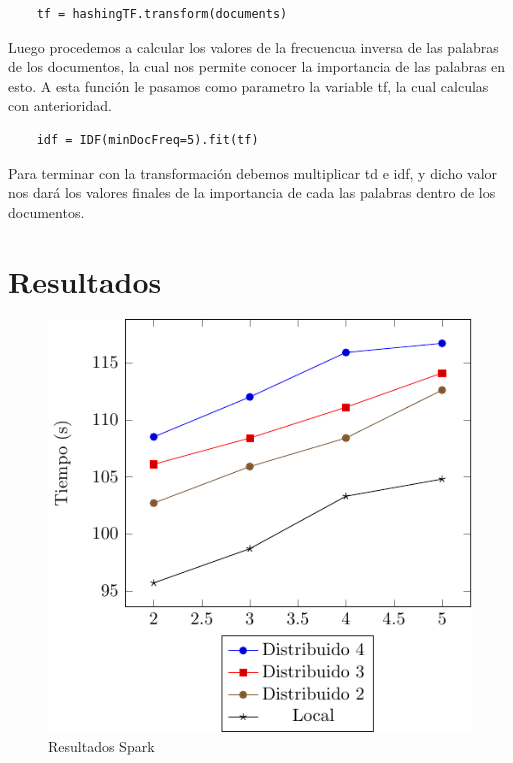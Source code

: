 \documentclass[conference,compsoc]{IEEEtran}
\begin{document}
\begin{lstlisting}
    tf = hashingTF.transform(documents)
\end{lstlisting}

\vspace{0.5cm}

Luego procedemos a calcular los valores de la frecuencua inversa de las
palabras de los documentos, la cual nos permite conocer la importancia de las
palabras en esto. A esta función le pasamos como parametro la variable tf, la
cual calculas con anterioridad.\\

\begin{lstlisting}
    idf = IDF(minDocFreq=5).fit(tf)
\end{lstlisting}

\vspace{0.5cm}

Para terminar con la transformación debemos multiplicar td e idf, y dicho valor
nos dará los valores finales de la importancia de cada las palabras dentro de
los documentos.

\section{Resultados}

\begin{figure}[H]
    \centering
    \includegraphics[scale=1]{ResultsSpark.pdf}
    \caption{Resultados Spark}
\end{figure}
\end{document}

